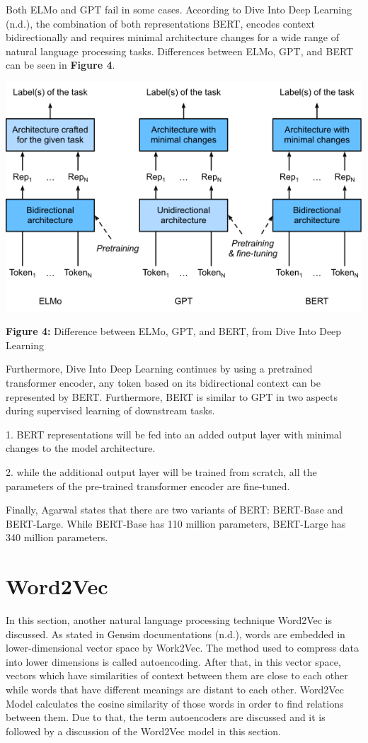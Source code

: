\documentclass[man]{apa7}
\begin{document}
Both ELMo and GPT fail in some cases. According to Dive Into Deep Learning (n.d.), the combination of both representations BERT, encodes context bidirectionally and requires minimal architecture changes for a wide range of natural language processing tasks. Differences between ELMo, GPT, and BERT can be seen in \textbf{Figure 4}.
\\[2\baselineskip]

\begin{center}
\includegraphics[scale=0.6]{elmo-gpt-bert.png}

\textbf{Figure 4:} Difference between ELMo, GPT, and BERT, from Dive Into Deep Learning\\[2\baselineskip]
\end{center}

Furthermore, Dive Into Deep Learning continues by using a pretrained transformer encoder, any token based on its bidirectional context can be represented by BERT. Furthermore, BERT is similar to GPT in two aspects during supervised learning of downstream tasks.

1. BERT representations will be fed into an added output layer with minimal changes to the model architecture. 

2. while the additional output layer will be trained from scratch, all the parameters of the pre-trained transformer encoder are fine-tuned.

Finally, Agarwal states that there are two variants of BERT: BERT-Base and BERT-Large. While BERT-Base has 110 million parameters, BERT-Large has 340 million parameters.

\section{Word2Vec}
In this section, another natural language processing technique Word2Vec is discussed. As stated in Gensim documentations (n.d.), words are embedded in lower-dimensional vector space by Work2Vec. The method used to compress data into lower dimensions is called autoencoding. After that, in this vector space, vectors which have similarities of context between them are close to each other while words that have different meanings are distant to each other. Word2Vec Model calculates the cosine similarity of those words in order to find relations between them. Due to that, the term autoencoders are discussed and it is followed by a discussion of the Word2Vec model in this section.
\end{document}

